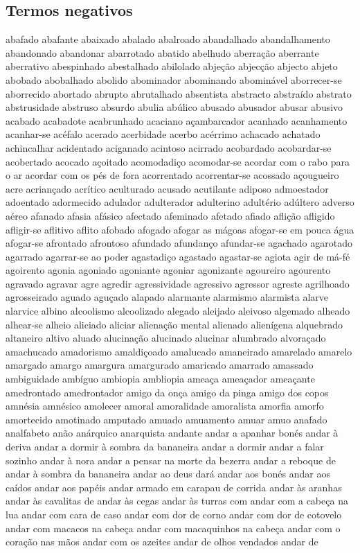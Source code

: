 \documentclass[ruledheader]{abnt_UFF}
\begin{document}
\subsection{Termos negativos}
abafado abafante abaixado abalado abalroado abandalhado abandalhamento abandonado abandonar abarrotado abatido abelhudo aberra\c{c}\~ao aberrante aberrativo abespinhado abestalhado abilolado abje\c{c}\~ao abjec\c{c}\~ao abjecto abjeto abobado abobalhado abolido abominador abominando abomin\'{a}vel aborrecer-se aborrecido abortado abrupto abrutalhado absentista abstracto abstra\'{i}do abstrato abstrusidade abstruso absurdo abulia ab\'{u}lico abusado abusador abusar abusivo acabado acabadote acabrunhado acaciano a\c{c}ambarcador acanhado acanhamento acanhar-se ac\'{e}falo acerado acerbidade acerbo ac\'{e}rrimo achacado achatado achincalhar acidentado aciganado acintoso acirrado acobardado acobardar-se acobertado acocado a\c{c}oitado acomodadi\c{c}o acomodar-se acordar com o rabo para o ar acordar com os p\'{e}s de fora acorrentado acorrentar-se acossado a\c{c}ougueiro acre acrian\c{c}ado acr\'{i}tico aculturado acusado acutilante adiposo admoestador adoentado adormecido adulador adulterador adulterino adult\'{e}rio ad\'{u}ltero adverso a\'{e}reo afanado afasia af\'{a}sico afectado afeminado afetado afiado afli\c{c}\~ao afligido afligir-se aflitivo aflito afobado afogado afogar as m\'{a}goas afogar-se em pouca \'{a}gua afogar-se afrontado afrontoso afundado afundan\c{c}o afundar-se agachado agarotado agarrado agarrar-se ao poder agastadi\c{c}o agastado agastar-se agiota agir de m\'{a}-f\'{e} agoirento agonia agoniado agoniante agoniar agonizante agoureiro agourento agravado agravar agre agredir agressividade agressivo agressor agreste agrilhoado agrosseirado aguado agu\c{c}ado alapado alarmante alarmismo alarmista alarve alarvice albino alcoolismo alcoolizado alegado aleijado aleivoso algemado alheado alhear-se alheio aliciado aliciar aliena\c{c}\~ao mental alienado alien\'{i}gena alquebrado altaneiro altivo aluado alucina\c{c}\~ao alucinado alucinar alumbrado alvora\c{c}ado amachucado amadorismo amaldi\c{c}oado amalucado amaneirado amarelado amarelo amargado amargo amargura amargurado amaricado amarrado amassado ambiguidade amb\'{i}guo ambiopia ambliopia amea\c{c}a amea\c{c}ador amea\c{c}ante amedrontado amedrontador amigo da on\c{c}a amigo da pinga amigo dos copos amn\'{e}sia amn\'{e}sico amolecer amoral amoralidade amoralista amorfia amorfo amortecido amotinado amputado amuado amuamento amuar amuo anafado analfabeto an\~ao an\'{a}rquico anarquista andante andar a apanhar bon\'{e}s andar \`{a} deriva andar a dormir \`{a} sombra da bananeira andar a dormir andar a falar sozinho andar \`{a} nora andar a pensar na morte da bezerra andar a reboque de andar \`{a} sombra da bananeira andar ao deus dar\'{a} andar aos bon\'{e}s andar aos ca\'{i}dos andar aos pap\'{e}is andar armado em carapau de corrida andar \`{a}s aranhas andar \`{a}s cavalitas de andar \`{a}s cegas andar \`{a}s turras com andar com a cabe\c{c}a na lua andar com cara de caso andar com dor de corno andar com dor de cotovelo andar com macacos na cabe\c{c}a andar com macaquinhos na cabe\c{c}a andar com o cora\c{c}\~ao nas m\~aos andar com os azeites andar de olhos vendados andar de 
\end{document}
